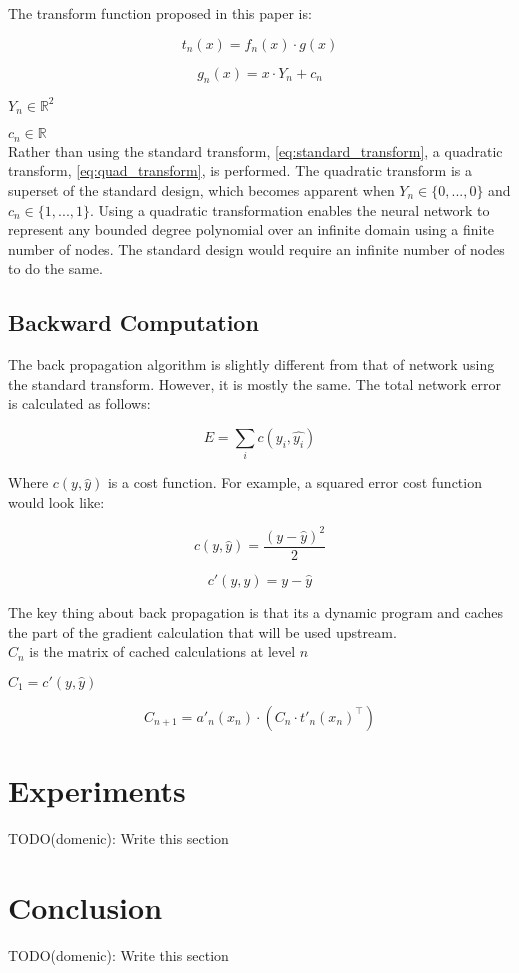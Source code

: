 \documentclass{article}
\begin{document}
The transform function proposed in this paper is:

\begin{equation} \label{eq:quad_transform}
t_n(x) =  f_n(x) \cdot g(x)
\end{equation}

\begin{equation} \label{eq:g}
g_n(x) = x \cdot Y_n + c_n
\end{equation}

$Y_n \in \mathbb{R}^2$

$c_n \in \mathbb{R}$\\

Rather than using the standard transform, \eqref{eq:standard_transform}, a quadratic transform, \eqref{eq:quad_transform}, is performed. The quadratic transform is a superset of the standard design, which becomes apparent when $Y_n \in \{0,...,0\}$ and $c_n \in \{1, ..., 1\}$. Using a quadratic transformation enables the neural network to represent any bounded degree polynomial over an infinite domain using a finite number of nodes. The standard design would require an infinite number of nodes to do the same.

\subsection{Backward Computation}

The back propagation algorithm is slightly different from that of network using the standard transform. However, it is mostly the same. The total network error is calculated as follows:

\begin{equation} \label{eq:total_error}
E = \sum_i c(y_i, \hat{y_i})
\end{equation}

Where $c(y, \hat{y})$ is a cost function. For example, a squared error cost function would look like:

\begin{equation} \label{eq:squared_cost}
c(y, \hat{y}) = \frac{(y - \hat{y})^2}{2}
\end{equation}

\begin{equation} \label{eq:squared_cost_prime}
c'(y, \hat{y}) = y - \hat{y}
\end{equation}

The key thing about back propagation is that its a dynamic program and caches the part of the gradient calculation that will be used upstream.\\

$C_n$ is the matrix of cached calculations at level $n$

$C_1 = c'(y, \hat{y})$

\begin{equation}
C_{n+1} = a'_n(x_n) \cdot (C_n \cdot t'_n(x_n)^\top)
\end{equation}


\section{Experiments}

TODO(domenic): Write this section

\section{Conclusion}

TODO(domenic): Write this section
\end{document}
